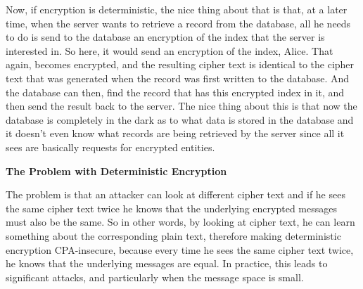 \documentclass[11pt]{article}
\begin{document}
Now, if encryption is deterministic, the nice thing about that is that,
at a later time, when the server wants to retrieve a record from the
database, all he needs to do is send to the database an encryption of
the index that the server is interested in. So here, it would send an
encryption of the index, Alice. That again, becomes encrypted, and the
resulting cipher text is identical to the cipher text that was generated
when the record was first written to the database. And the database can
then, find the record that has this encrypted index in it, and then send
the result back to the server. The nice thing about this is that now the
database is completely in the dark as to what data is stored in the
database and it doesn't even know what records are being retrieved by
the server since all it sees are basically requests for encrypted
entities.

\textbf{The Problem with Deterministic Encryption}

The problem is that an attacker can look at different cipher text and if
he sees the same cipher text twice he knows that the underlying
encrypted messages must also be the same. So in other words, by looking
at cipher text, he can learn something about the corresponding plain
text, therefore making deterministic encryption CPA-insecure, because
every time he sees the same cipher text twice, he knows that the
underlying messages are equal. In practice, this leads to significant
attacks, and particularly when the message space is small.
\end{document}
